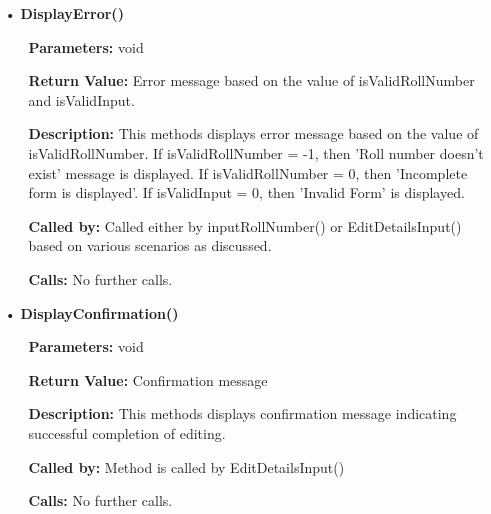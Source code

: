 \documentclass{scrreprt}
\begin{document}
\begin{enumerate}
\begin{itemize}
\item [•] \textbf{DisplayError()}
\begin{itemize}
\item [] \textbf{Parameters:} void 
\item [] \textbf{Return Value:} Error message based on the value of isValidRollNumber and isValidInput.
\item [] \textbf{Description:} This methods displays error message based on the value of isValidRollNumber. If isValidRollNumber = -1, then 'Roll number doesn't exist' message is displayed. If isValidRollNumber = 0, then 'Incomplete form is displayed'. If isValidInput = 0, then 'Invalid Form' is displayed.
\item [] \textbf{Called by:} Called either by inputRollNumber() or EditDetailsInput() based on various scenarios as discussed.
\item [] \textbf{Calls:} No further calls.
\end{itemize}
\end{itemize}
\begin{itemize}
\item [•] \textbf{DisplayConfirmation()}
\begin{itemize}
\item [] \textbf{Parameters:} void
\item [] \textbf{Return Value:} Confirmation message
\item [] \textbf{Description:} This methods displays confirmation message indicating successful completion of editing.
\item [] \textbf{Called by:} Method is called by EditDetailsInput()
\item [] \textbf{Calls:} No further calls.
\end{itemize}
\end{itemize}
\end{enumerate}
\end{document}
